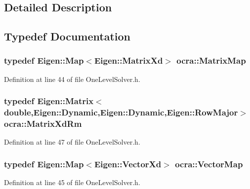 \subsection{Detailed Description}


\subsection{Typedef Documentation}
\subsubsection[{\texorpdfstring{Matrix\+Map}{MatrixMap}}]{\setlength{\rightskip}{0pt plus 5cm}typedef Eigen\+::\+Map$<$Eigen\+::\+Matrix\+Xd$>$ {\bf ocra\+::\+Matrix\+Map}}\hypertarget{group__solver_ga2890a4739c18700eeea0645d1e41b5f7}{}\label{group__solver_ga2890a4739c18700eeea0645d1e41b5f7}


Definition at line 44 of file One\+Level\+Solver.\+h.

\subsubsection[{\texorpdfstring{Matrix\+Xd\+Rm}{MatrixXdRm}}]{\setlength{\rightskip}{0pt plus 5cm}typedef Eigen\+::\+Matrix$<$double,Eigen\+::\+Dynamic,Eigen\+::\+Dynamic,Eigen\+::\+Row\+Major$>$ {\bf ocra\+::\+Matrix\+Xd\+Rm}}\hypertarget{group__solver_ga70eb87299c2fc1db3c4aac05df67d889}{}\label{group__solver_ga70eb87299c2fc1db3c4aac05df67d889}


Definition at line 47 of file One\+Level\+Solver.\+h.

\subsubsection[{\texorpdfstring{Vector\+Map}{VectorMap}}]{\setlength{\rightskip}{0pt plus 5cm}typedef Eigen\+::\+Map$<$Eigen\+::\+Vector\+Xd$>$ {\bf ocra\+::\+Vector\+Map}}\hypertarget{group__solver_ga48f83fdb8879c800a49682c6f9c3f2e5}{}\label{group__solver_ga48f83fdb8879c800a49682c6f9c3f2e5}


Definition at line 45 of file One\+Level\+Solver.\+h.

